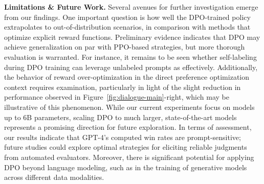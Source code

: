 \textbf{Limitations \& Future Work.} Several avenues for further investigation emerge from our findings. One important question is how well the DPO-trained policy extrapolates to out-of-distribution scenarios, in comparison with methods that optimize explicit reward functions. Preliminary evidence indicates that DPO may achieve generalization on par with PPO-based strategies, but more thorough evaluation is warranted. For instance, it remains to be seen whether self-labeling during DPO training can leverage unlabeled prompts as effectively. Additionally, the behavior of reward over-optimization in the direct preference optimization context requires examination, particularly in light of the slight reduction in performance observed in Figure~\ref{fig:dialogue-main}-right, which may be illustrative of this phenomenon. While our current experiments focus on models up to 6B parameters, scaling DPO to much larger, state-of-the-art models represents a promising direction for future exploration. In terms of assessment, our results indicate that GPT-4's computed win rates are prompt-sensitive; future studies could explore optimal strategies for eliciting reliable judgments from automated evaluators. Moreover, there is significant potential for applying DPO beyond language modeling, such as in the training of generative models across different data modalities.

